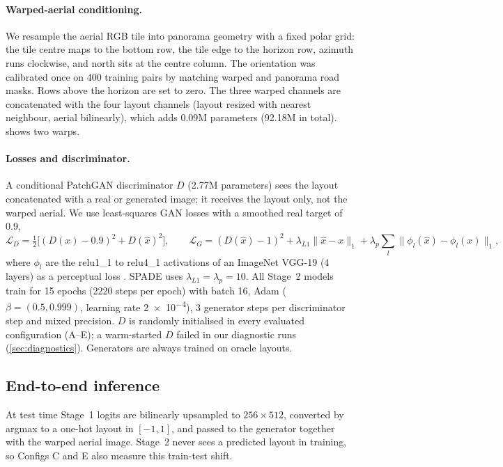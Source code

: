 \documentclass[11pt]{article}
\begin{document}
\paragraph{Warped-aerial conditioning.} We resample the aerial RGB tile into panorama geometry with a fixed
polar grid: the tile centre maps to the bottom row, the tile edge to the horizon row, azimuth runs clockwise,
and north sits at the centre column. The orientation was calibrated once on 400 training pairs by matching
warped and panorama road masks. Rows above the horizon are set to zero. The three warped channels are
concatenated with the four layout channels (layout resized with nearest neighbour, aerial bilinearly), which
adds 0.09M parameters (92.18M in total).  shows two warps.

\paragraph{Losses and discriminator.} A conditional PatchGAN discriminator $D$ (2.77M parameters) sees the
layout concatenated with a real or generated image; it receives the layout only, not the warped aerial. We use
least-squares GAN losses \cite{mao2017lsgan} with a smoothed real target of 0.9,
\begin{equation}
  \mathcal{L}_D=\tfrac{1}{2}\big[(D(x)-0.9)^2+D(\hat x)^2\big],\qquad
  \mathcal{L}_G=(D(\hat x)-1)^2+\lambda_{L1}\lVert\hat x-x\rVert_1
  +\lambda_{p}\sum_{l}\lVert\phi_l(\hat x)-\phi_l(x)\rVert_1,
  \label{eq:gan}
\end{equation}
where $\phi_l$ are the relu1\_1 to relu4\_1 activations of an ImageNet VGG-19 (4 layers) as a perceptual loss
\cite{johnson2016perceptual}. SPADE uses $\lambda_{L1}=\lambda_p=10$. All Stage~2 models train for 15 epochs
(\num{2220} steps per epoch) with batch 16, Adam ($\beta=(0.5,0.999)$, learning rate \num{2e-4}), 3 generator
steps
per discriminator step and mixed precision. $D$ is randomly initialised in every evaluated configuration
(A--E); a warm-started $D$ failed in our diagnostic runs (\cref{sec:diagnostics}). Generators are always
trained on oracle layouts.

\subsection{End-to-end inference}
\label{sec:inference}
At test time Stage~1 logits are bilinearly upsampled to $256\times512$, converted by argmax to a one-hot layout
in $[-1,1]$, and passed to the generator together with the warped aerial image. Stage~2 never sees a predicted
layout in training, so Configs C and E also measure this train-test shift.
\end{document}
